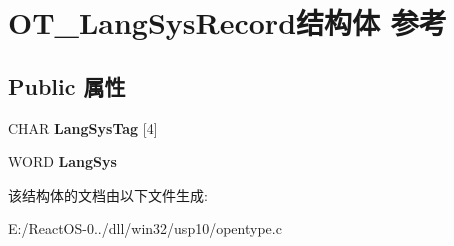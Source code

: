 \hypertarget{struct_o_t___lang_sys_record}{}\section{O\+T\+\_\+\+Lang\+Sys\+Record结构体 参考}
\label{struct_o_t___lang_sys_record}
\subsection*{Public 属性}
\begin{DoxyCompactItemize}
\item 
\mbox{\label{struct_o_t___lang_sys_record_a679672a065162b5d2da1ad5c0e466a9e}} 
C\+H\+AR {\bfseries Lang\+Sys\+Tag} \mbox{[}4\mbox{]}
\item 
\mbox{\label{struct_o_t___lang_sys_record_a5f28f4f5e56cb0316542e6a26071b7b8}} 
W\+O\+RD {\bfseries Lang\+Sys}
\end{DoxyCompactItemize}


该结构体的文档由以下文件生成\+:\begin{DoxyCompactItemize}
\item 
E\+:/\+React\+O\+S-\/0../dll/win32/usp10/opentype.\+c\end{DoxyCompactItemize}
